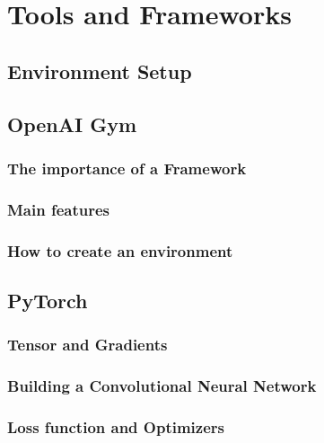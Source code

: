\chapter{Tools and Frameworks}



\section{Environment Setup}



\section{OpenAI Gym}



\subsection{The importance of a Framework}



\subsection{Main features}



\subsection{How to create an environment}



\section{PyTorch}



\subsection{Tensor and Gradients}



\subsection{Building a Convolutional Neural Network}



\subsection{Loss function and Optimizers}



